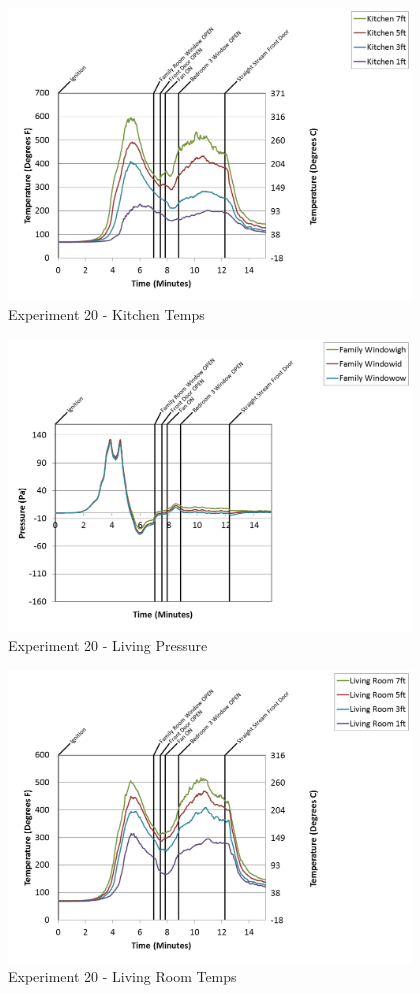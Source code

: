 \documentclass{article}
\begin{document}
\begin{appendices}
\begin{figure}[h!]
	\centering
	\includegraphics[height=3.05in]{0_Images/Results_Charts/Exp_20_Charts/KitchenTemps.png}
	\caption{Experiment 20 - Kitchen Temps}
\end{figure}

\clearpage

\begin{figure}[h!]
	\centering
	\includegraphics[height=3.05in]{0_Images/Results_Charts/Exp_20_Charts/LivingPressure.png}
	\caption{Experiment 20 - Living Pressure}
\end{figure}


\begin{figure}[h!]
	\centering
	\includegraphics[height=3.05in]{0_Images/Results_Charts/Exp_20_Charts/LivingRoomTemps.png}
	\caption{Experiment 20 - Living Room Temps}
\end{figure}


\end{appendices}
\end{document}
